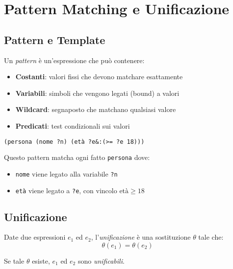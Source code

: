 \section{Pattern Matching e Unificazione}

\subsection{Pattern e Template}

Un \textit{pattern} è un'espressione che può contenere:

\begin{itemize}
\item \textbf{Costanti}: valori fissi che devono matchare esattamente
\item \textbf{Variabili}: simboli che vengono legati (bound) a valori
\item \textbf{Wildcard}: segnaposto che matchano qualsiasi valore
\item \textbf{Predicati}: test condizionali sui valori
\end{itemize}

\begin{esempio}
\begin{lstlisting}[language=CLIPS]
(persona (nome ?n) (età ?e&:(>= ?e 18)))
\end{lstlisting}

Questo pattern matcha ogni fatto \texttt{persona} dove:
\begin{itemize}
\item \texttt{nome} viene legato alla variabile \texttt{?n}
\item \texttt{età} viene legato a \texttt{?e}, con vincolo $\text{età} \geq 18$
\end{itemize}
\end{esempio}

\subsection{Unificazione}

\begin{definizione}[Unificazione]
Date due espressioni $e_1$ ed $e_2$, l'\textit{unificazione} è una sostituzione $\theta$ tale che:
\begin{equation}
\theta(e_1) = \theta(e_2)
\end{equation}

Se tale $\theta$ esiste, $e_1$ ed $e_2$ sono \textit{unificabili}.
\end{definizione}

